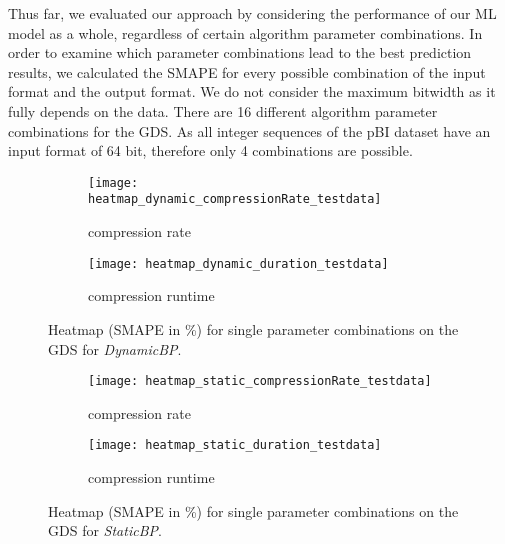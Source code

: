 Thus far, we evaluated our approach by considering the performance of our ML model as a whole, regardless of certain algorithm parameter combinations. In order to examine which parameter combinations lead to the best prediction results, we calculated the SMAPE for every possible combination of the input format and the output format. We do not consider the maximum bitwidth as it fully depends on the data. There are 16 different algorithm parameter combinations for the GDS. As all integer sequences of the pBI dataset have an input format of 64 bit, therefore only 4 combinations are possible. 
\newpage
\begin{figure}[h]
    \centering
    \begin{subfigure}{.5\textwidth}
      \centering
      \texttt{[image: heatmap\_dynamic\_compressionRate\_testdata]}
      \caption{compression rate}
    \end{subfigure}%
    \begin{subfigure}{.5\textwidth}
      \centering
      \texttt{[image: heatmap\_dynamic\_duration\_testdata]}
      \caption{compression runtime}
    \end{subfigure}%
    \caption{Heatmap (SMAPE in \%) for single parameter combinations on the GDS for \emph{DynamicBP}.}
    \label{fig:heatmaps-single-smapes-tds-dynamic}
\end{figure}
\begin{figure}[h]
    \begin{subfigure}{.5\textwidth}
      \centering
      \texttt{[image: heatmap\_static\_compressionRate\_testdata]}
      \caption{compression rate}
    \end{subfigure}%
    \begin{subfigure}{.5\textwidth}
      \centering
      \texttt{[image: heatmap\_static\_duration\_testdata]}
      \caption{compression runtime}
    \end{subfigure}%
    \caption{Heatmap (SMAPE in \%) for single parameter combinations on the GDS for \emph{StaticBP}.}
    \label{fig:heatmaps-single-smapes-tds-static}
\end{figure}

